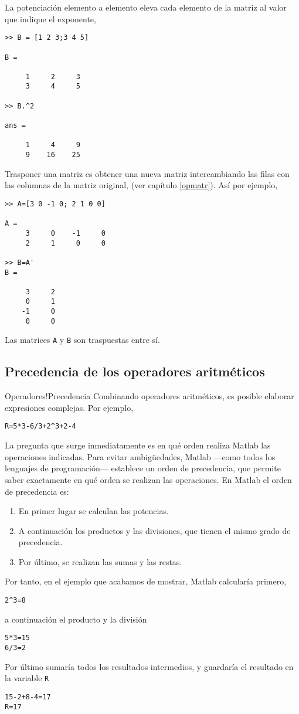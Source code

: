 La potenciación elemento a elemento eleva cada elemento de la matriz al valor que indique el exponente,

\begin{verbatim}
>> B = [1 2 3;3 4 5]

B =

     1     2     3
     3     4     5

>> B.^2

ans =

     1     4     9
     9    16    25

\end{verbatim}
Trasponer una matriz es obtener una nueva matriz intercambiando las filas con las columnas de la matriz original, (ver capítulo \ref{opmatr}). Así por ejemplo,
\begin{verbatim}
>> A=[3 0 -1 0; 2 1 0 0]

A =
     3     0    -1     0
     2     1     0     0

>> B=A'
B =

     3     2
     0     1
    -1     0
     0     0
\end{verbatim}
Las matrices \texttt{A} y \texttt{B} son traspuestas entre sí.

\subsection{Precedencia de los operadores aritméticos}{Operadores!Precedencia}
Combinando operadores aritméticos, es posible elaborar expresiones complejas. Por ejemplo,
\begin{verbatim}
R=5*3-6/3+2^3+2-4
\end{verbatim}
La pregunta que surge inmediatamente es en qué orden realiza Matlab las operaciones indicadas. Para evitar ambigüedades, Matlab ---como todos los lenguajes de programación--- establece un orden de precedencia, que permite saber exactamente en qué orden se realizan las operaciones. En Matlab el orden de precedencia es:
\begin{enumerate}
\item En primer lugar se calculan las potencias.
\item A continuación los productos y las divisiones, que tienen el mismo grado de precedencia.
\item Por último, se realizan las sumas y las restas. 
\end{enumerate} 

Por tanto, en el ejemplo que acabamos de mostrar, Matlab calcularía primero,
\begin{verbatim}
2^3=8
\end{verbatim}
a continuación el producto y la división
\begin{verbatim}
5*3=15
6/3=2
\end{verbatim}
Por último sumaría todos los resultados intermedios, y guardaría el resultado en la variable \texttt{R}
\begin{verbatim}
15-2+8-4=17
R=17
\end{verbatim}

